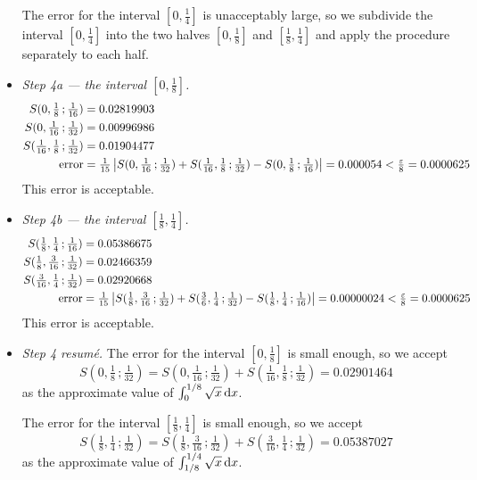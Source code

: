 \begin{eg}
\begin{itemize}
The error for the interval $[0,\tfrac{1}{4}]$ is
unacceptably large, so we subdivide the interval $[0,\tfrac{1}{4}]$ into
the two halves $[0,\tfrac{1}{8}]$ and $[\tfrac{1}{8},\tfrac{1}{4}]$
and apply the procedure separately to each half.

\item \emph{Step 4a --- the interval $[0,\tfrac{1}{8}]$.}
\begin{align*}
S(0,\tfrac{1}{8}\,;\tfrac{1}{16})&= 0.02819903   \\
S(0,\tfrac{1}{16}\,;\tfrac{1}{32})&= 0.00996986    \\
S(\tfrac{1}{16},\tfrac{1}{8}\,;\tfrac{1}{32})&= 0.01904477    \\
\text{error}&=\tfrac{1}{15}\left|S(0,\tfrac{1}{16}\,;\tfrac{1}{32})
                              +S(\tfrac{1}{16},\tfrac{1}{8}\,;\tfrac{1}{32})
                              -S(0,\tfrac{1}{8}\,;\tfrac{1}{16})\right|
             =  0.000054  < \tfrac{\varepsilon}{8} = 0.0000625
\end{align*}
This error is acceptable.


\item \emph{Step 4b --- the interval $[\tfrac{1}{8},\tfrac{1}{4}]$.}
\begin{align*}
S(\tfrac{1}{8},\tfrac{1}{4}\,;\tfrac{1}{16})&= 0.05386675   \\
S(\tfrac{1}{8},\tfrac{3}{16}\,;\tfrac{1}{32})&= 0.02466359  \\
S(\tfrac{3}{16},\tfrac{1}{4}\,;\tfrac{1}{32})&= 0.02920668   \\
\text{error}&=\tfrac{1}{15}\left|S(\tfrac{1}{8},\tfrac{3}{16}\,;\tfrac{1}{32})
                              +S(\tfrac{3}{6},\tfrac{1}{4}\,;\tfrac{1}{32})
                              -S(\tfrac{1}{8},\tfrac{1}{4}\,;\tfrac{1}{16})\right|
             =  0.00000024  <\tfrac{\varepsilon}{8} = 0.0000625
\end{align*}
This error is acceptable.


\item\emph{Step 4 resum\'e.} The error for the interval
$[0,\tfrac{1}{8}]$ is small enough, so we accept
\begin{equation*}
S(0,\tfrac{1}{8}\,;\tfrac{1}{32})
  = S(0,\tfrac{1}{16}\,;\tfrac{1}{32})
   + S(\tfrac{1}{16},\tfrac{1}{8}\,;\tfrac{1}{32})
  =  0.02901464
\end{equation*}
as the approximate value of $\int_0^{1/8}\sqrt{x}\,\mathrm{d}x$.

The error for the interval
$[\tfrac{1}{8},\tfrac{1}{4}]$ is small enough, so we accept
\begin{equation*}
S(\tfrac{1}{8},\tfrac{1}{4}\,;\tfrac{1}{32})
  = S(\tfrac{1}{8},\tfrac{3}{16}\,;\tfrac{1}{32})
   + S(\tfrac{3}{16},\tfrac{1}{4}\,;\tfrac{1}{32})
  = 0.05387027
\end{equation*}
as the approximate value of $\int_{1/8}^{1/4}\sqrt{x}\,\mathrm{d}x$.


\end{itemize}
\end{eg}
